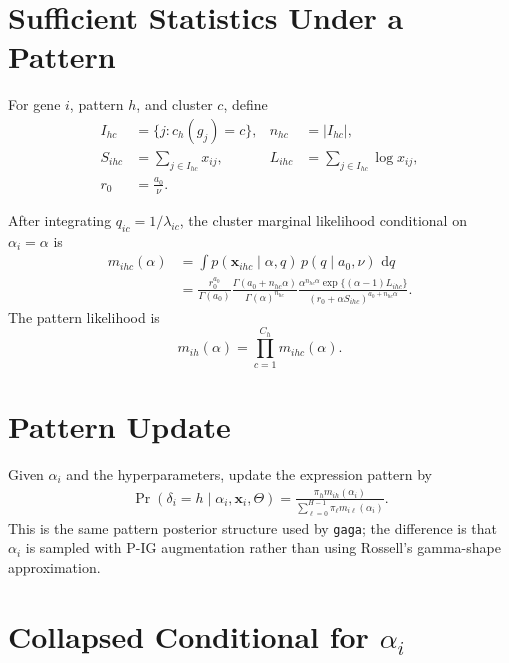 \documentclass[11pt]{article}
\newcommand{\diff}{\,\mathrm{d}}
\begin{document}
\section{Sufficient Statistics Under a Pattern}

For gene \(i\), pattern \(h\), and cluster \(c\), define
\begin{align}
  I_{hc} &= \{j: c_h(g_j)=c\}, &
  n_{hc} &= |I_{hc}|, \nonumber\\
  S_{ihc} &= \sum_{j\in I_{hc}} x_{ij}, &
  L_{ihc} &= \sum_{j\in I_{hc}} \log x_{ij}, \nonumber\\
  r_0 &= \frac{a_0}{\nu}.
\end{align}

After integrating \(q_{ic}=1/\lambda_{ic}\), the cluster marginal likelihood
conditional on \(\alpha_i=\alpha\) is
\begin{align}
  m_{ihc}(\alpha)
  &=
  \int p(\bm x_{ihc}\mid \alpha,q)\,p(q\mid a_0,\nu)\,\diff q \nonumber\\
  &=
  \frac{r_0^{a_0}}{\Gamma(a_0)}
  \frac{\Gamma(a_0+n_{hc}\alpha)}{\Gamma(\alpha)^{n_{hc}}}
  \frac{
    \alpha^{n_{hc}\alpha}
    \exp\{(\alpha-1)L_{ihc}\}
  }{
    (r_0+\alpha S_{ihc})^{a_0+n_{hc}\alpha}
  }.
  \label{eq:cluster-marginal}
\end{align}
The pattern likelihood is
\[
  m_{ih}(\alpha)=\prod_{c=1}^{C_h} m_{ihc}(\alpha).
\]

\section{Pattern Update}

Given \(\alpha_i\) and the hyperparameters, update the expression pattern by
\begin{align}
  \Pr(\delta_i=h\mid \alpha_i,\bm x_i,\Theta)
  =
  \frac{\pi_h m_{ih}(\alpha_i)}
       {\sum_{\ell=0}^{H-1}\pi_\ell m_{i\ell}(\alpha_i)}.
  \label{eq:pattern-update}
\end{align}
This is the same pattern posterior structure used by \texttt{gaga}; the
difference is that \(\alpha_i\) is sampled with P-IG augmentation rather than
using Rossell's gamma-shape approximation.

\section{Collapsed Conditional for \texorpdfstring{\(\alpha_i\)}{alpha}}
\end{document}
